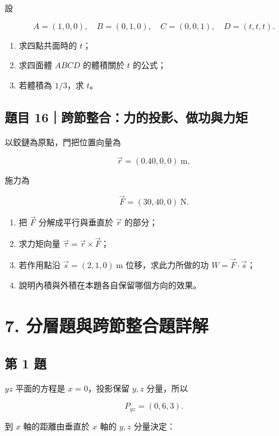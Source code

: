 \documentclass[11pt,a4paper]{article}
\providecommand{\tightlist}{%
  \setlength{\itemsep}{0pt}\setlength{\parskip}{0pt}}
\begin{document}
設

\[
A=(1,0,0),\quad B=(0,1,0),\quad C=(0,0,1),\quad D=(t,t,t).
\]

\begin{enumerate}
\def\labelenumi{\arabic{enumi}.}
\tightlist
\item
  求四點共面時的 \(t\)；
\item
  求四面體 \(ABCD\) 的體積關於 \(t\) 的公式；
\item
  若體積為 \(1/3\)，求 \(t\)。
\end{enumerate}

\subsection{題目 16｜跨節整合：力的投影、做功與力矩}\label{ux984cux76ee-16ux8de8ux7bc0ux6574ux5408ux529bux7684ux6295ux5f71ux505aux529fux8207ux529bux77e9}

以鉸鏈為原點，門把位置向量為

\[
\vec r=(0.40,0,0)\ \mathrm{m},
\]

施力為

\[
\vec F=(30,40,0)\ \mathrm{N}.
\]

\begin{enumerate}
\def\labelenumi{\arabic{enumi}.}
\tightlist
\item
  把 \(\vec F\) 分解成平行與垂直於 \(\vec r\) 的部分；
\item
  求力矩向量 \(\vec\tau=\vec r\times\vec F\)；
\item
  若作用點沿 \(\vec s=(2,1,0)\ \mathrm{m}\) 位移，求此力所做的功 \(W=\vec F\cdot\vec s\)；
\item
  說明內積與外積在本題各自保留哪個方向的效果。
\end{enumerate}

\section{7. 分層題與跨節整合題詳解}\label{ux5206ux5c64ux984cux8207ux8de8ux7bc0ux6574ux5408ux984cux8a73ux89e3}

\subsection{第 1 題}\label{ux7b2c-1-ux984c}

\(yz\) 平面的方程是 \(x=0\)，投影保留 \(y,z\) 分量，所以

\[
P_{yz}=(0,6,3).
\]

到 \(x\) 軸的距離由垂直於 \(x\) 軸的 \(y,z\) 分量決定：
\end{document}
